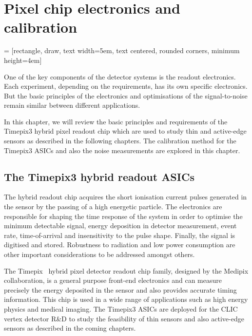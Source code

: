 \chapter{Pixel chip electronics and calibration}
\label{ch:FE_electronics}

 = [rectangle, draw, text width=5em, text centered, rounded corners, minimum
height=4em]
\usetikzlibrary{backgrounds,fit,decorations.pathreplacing} 

One of the key components of the detector systems is the readout
electronics. Each experiment, depending on the requirements, has its
own specific electronics. But the basic principles of the electronics
and optimisations of the signal-to-noise remain similar between
different applications.

In this chapter, we will review the basic principles and requirements
of the Timepix3 hybrid pixel readout chip which are used to study thin
and active-edge sensors as described in the following chapters. The
calibration method for the Timepix3 ASICs and also the noise
measurements are explored in this chapter.

\section{The Timepix3 hybrid readout ASICs}
\label{sec:TimepixChip}

The hybrid readout chip acquires the short ionisation current pulses
generated in the sensor by the passing of a high energetic
particle. The electronics are responsible for shaping the time
response of the system in order to optimise the minimum detectable
signal, energy deposition in detector measurement, event rate,
time-of-arrival and insensitivity to the pulse shape. Finally, the
signal is digitised and stored. Robustness to radiation and low power
consumption are other important considerations to be addressed amongst
others.


The Timepix~\cite{art:tmpx,Timepix3Poikela} hybrid pixel detector
readout chip family, designed by the Medipix collaboration, is a
general purpose front-end electronics and can measure precisely the
energy deposited in the sensor and also provides accurate timing
information. This chip is used in a wide range of applications such as
high energy physics and medical imaging. The Timepix3 ASICs are
deployed for the CLIC vertex detector R\&D to study the feasibility of
thin sensors and also active-edge sensors as described in the coming
chapters. 

